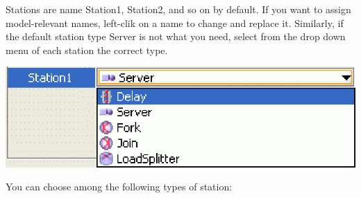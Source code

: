 Stations are name Station1, Station2, and so on by default. If you want to assign model-relevant names, left-clik on a name to change and replace 
it.
Similarly, if the default station type Server is not what you need, select from the drop down menu of each station the correct type.\\
\begin{center}
\includegraphics[scale=.5]{img/jsim/station_types.eps}
\end{center}
You can choose among the following types of station:
